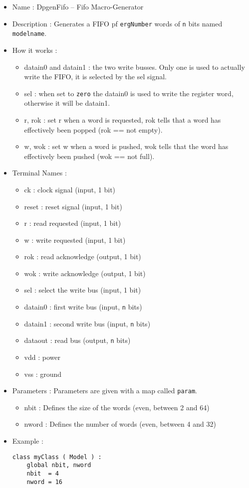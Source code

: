 \begin{itemize}
    \item Name : DpgenFifo -- Fifo Macro-Generator
    \item Description : Generates a FIFO pf \verb-ergNumber- words of \verb-n- bits named \verb-modelname-.
    \item How it works :
    \begin{itemize}
        \item datain0 and datain1 : the two write busses. Only one is used to actually write the FIFO, it is selected by the sel signal.
        \item sel : when set to \verb-zero- the datain0 is used to write the register word, otherwise it will be datain1.
        \item r, rok : set r when a word is requested, rok tells that a word has effectively been popped (rok == not empty).
        \item w, wok : set w when a word is pushed, wok tells that the word has effectively been pushed (wok == not full).
    \end{itemize}
    \item Terminal Names :
    \begin{itemize}
        \item ck : clock signal (input, 1 bit)
        \item reset : reset signal (input, 1 bit)
        \item r : read requested (input, 1 bit)
        \item w : write requested (input, 1 bit)
        \item rok : read acknowledge (output, 1 bit)
        \item wok : write acknowledge (output, 1 bit) 
        \item sel : select the write bus (input, 1 bit)
        \item datain0 : first write bus (input, \verb-n- bits)
        \item datain1 : second write bus (input, \verb-n- bits)
        \item dataout : read bus (output, \verb-n- bits)
        \item vdd : power
        \item vss : ground
    \end{itemize}
    \item Parameters : Parameters are given with a map called \verb-param-.
    \begin{itemize}
        \item nbit : Defines the size of the words (even, between 2 and 64)
        \item nword : Defines the number of words (even, between 4 and 32)
    \end{itemize}
    \item Example :
\begin{verbatim}
class myClass ( Model ) :
    global nbit, nword
    nbit  = 4
    nword = 16


\end{verbatim}
\end{itemize}
